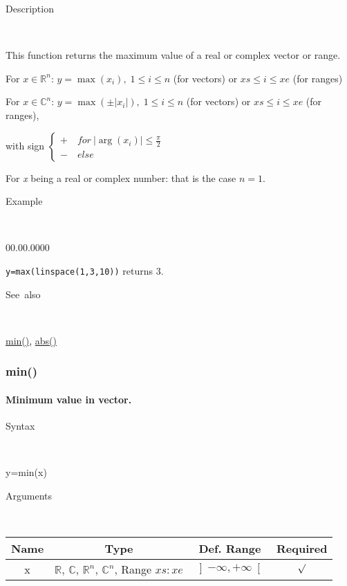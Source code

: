 \begin{description}
\item [Description]~
\end{description}
This function returns the maximum value of a real or complex vector
or range.

\medskip{}
For $x\in$$\mathbb{R}^{n}$: $y=$$\max\left(x_{i}\right),\;1\leq i\leq n$
(for vectors) or $xs\leq i\leq xe$ (for ranges)
\medskip{}

For $x\in\mathbb{C}^{n}$: $y=\max\left(\pm\left|x_{i}\right|\right),\;1\leq i\leq n$
(for vectors) or $xs\leq i\leq xe$ (for ranges),

with sign $\left\{ \begin{array}{l}
+\quad for\:\left|\arg\left(x_{i}\right)\right|\leq\frac{\pi}{2}\\
-\quad else\end{array}\right.$
\medskip{}

\noindent For \textit{x} being a real or complex number: that is the
case $n=1$.

\begin{description}
\item [Example]~
\end{description}
\begin{lyxlist}{00.00.0000}
\item [\texttt{y=max(linspace(1,3,10))}]returns 3.
\end{lyxlist}
\begin{description}
\item [See~also]~
\end{description}
\textcolor{blue}{\hyperlink{min}{min()}}\textcolor{black}{,} \textcolor{blue}{\hyperlink{abs}{abs()}}


\newpage
\subsubsection*{\hypertarget{min}{}{\Large min()}}


\paragraph{\label{par:Minimum}Minimum value in vector.}

\begin{description}
\item [Syntax]~
\end{description}
y=min(x)

\begin{description}
\item [Arguments]~
\end{description}
\begin{tabular}{|c|c|c|c|}
\hline 
Name&
Type&
Def. Range&
Required\tabularnewline
\hline
\hline 
x&
$\mathbb{R}$, $\mathbb{C}$, $\mathbb{R}^{n}$, $\mathbb{C}^{n}$,
Range $xs:xe$&
$\left]-\infty,+\infty\right[$&
$\surd$\tabularnewline
\hline
\end{tabular}

